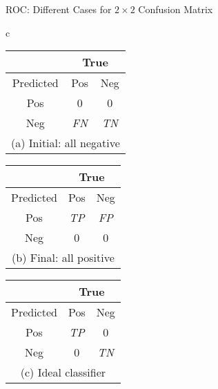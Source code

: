 \begin{frame}[fragile]{ROC: Different Cases for $2 \times 2$ Confusion
  Matrix}

\begin{footnotesize}
{\begin{tabular}{c}
{
  \label{tab:class:eval:CMcases:neg}
  \renewcommand{\arraystretch}{1.1}\begin{tabular}{|c|c|c|}
  \hline
    & \multicolumn{2}{c|}{True}\\
  \hline
  Predicted & Pos & Neg\\
  \hline
  Pos& 0 & 0\\
  Neg& {\it FN} & {\it TN}\\
  \hline
\multicolumn{3}{c}{\fontsize{8}{8}\selectfont(a) Initial: all negative}\\
  \end{tabular}
  }
  \hspace{0.15in}
{
  \label{tab:class:eval:CMcases:pos}
  \renewcommand{\arraystretch}{1.1}\begin{tabular}{|c|c|c|}
  \hline
    & \multicolumn{2}{c|}{True}\\
  \hline
  Predicted& Pos & Neg\\
  \hline
  Pos& {\it TP} & {\it FP}\\
  Neg& 0 & 0\\
  \hline
\multicolumn{3}{c}{\fontsize{8}{8}\selectfont(b) F{i}nal: all positive}\\
  \end{tabular}}
  \hspace{0.15in}
{
  \label{tab:class:eval:CMcases:ideal}
  \renewcommand{\arraystretch}{1.1}\begin{tabular}{|c|c|c|}
  \hline
    & \multicolumn{2}{c|}{True}\\
    \hline
  Predicted & Pos & Neg\\
  \hline
  Pos& {\it TP} & 0\\
  Neg& 0 & {\it TN}\\
  \hline
\multicolumn{3}{c}{\fontsize{8}{8}\selectfont(c) Ideal classif\/{i}er}\\
  \end{tabular}
  }
\end{tabular}}%
\end{footnotesize}
\end{frame}



